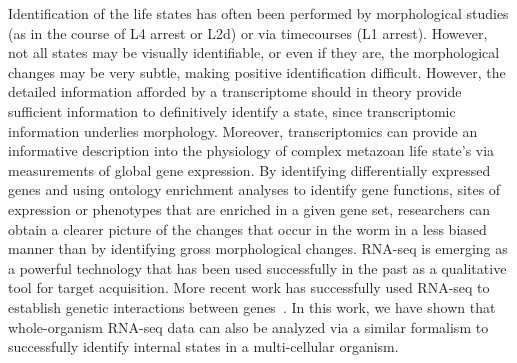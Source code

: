 Identification of the \cel{} life states has often been performed by
morphological studies (as in the course of L4 arrest or L2d) or via
timecourses (L1 arrest). However, not all states may be visually identifiable,
or even if they are, the morphological changes may be very subtle, making
positive identification difficult. However, the detailed information afforded
by a transcriptome should in theory provide sufficient information to
definitively identify a state, since transcriptomic information underlies
morphology. Moreover, transcriptomics can provide an informative description
into the physiology of complex metazoan life state's via measurements of global
gene expression. By identifying differentially expressed genes and using
ontology enrichment analyses to identify gene functions, sites of expression
or phenotypes that are enriched in a given gene set, researchers can obtain a
clearer picture of the changes that occur in the worm in a less biased manner
than by identifying gross morphological changes.
RNA-seq is emerging as a powerful technology that has been used successfully in
the past as a qualitative tool for target acquisition. More recent work has
successfully used RNA-seq to establish genetic interactions between
genes~\citep{Dixit2016,Adamson2016}.
In this work, we have shown that whole-organism RNA-seq data can also be analyzed
via a similar formalism to successfully identify internal states in a
multi-cellular organism.

%


